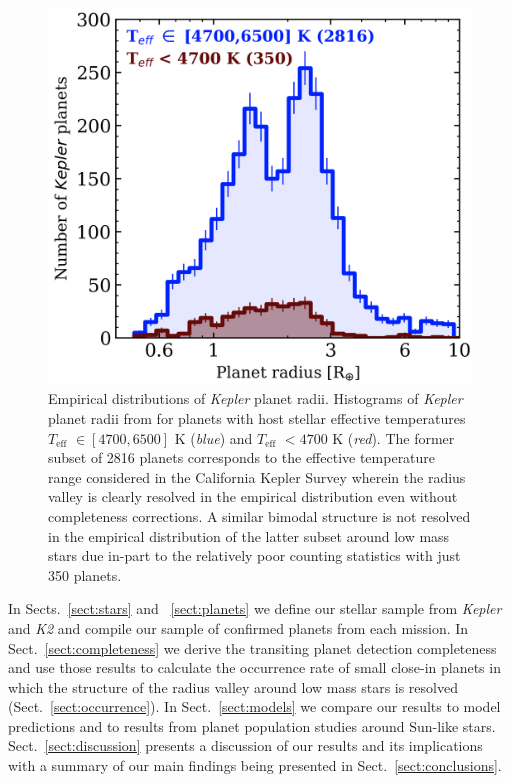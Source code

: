 \documentclass[twocolumn]{emulateapj}
\newcommand{\kepler}[1]{\emph{Kepler}#1}
\newcommand{\ktwo}[1]{\emph{K2}#1}
\newcommand{\teff}[1]{$T_{\text{eff}}$#1}
\begin{document}
\begin{figure}
  \centering
  \includegraphics[width=0.98\hsize]{figures/Bergerplanethist.png}
  \caption{Empirical distributions of \kepler{} planet radii. Histograms of \kepler{} planet radii
    from \cite{berger18} for planets with host stellar effective temperatures \teff{} $\in [4700,6500]$ K
    (\emph{blue}) and \teff{} $<4700$ K (\emph{red}). The former subset of 2816 planets corresponds to the
    effective temperature range considered in the California Kepler Survey \citep[CKS;][]{fulton17}
    wherein the radius valley is clearly
    resolved in the empirical distribution even without completeness corrections. A similar bimodal
    structure is not resolved in the empirical distribution of the latter subset around low mass stars
    due in-part to the relatively poor counting statistics with just 350 planets.}
  \label{fig:berger}
\end{figure}


In Sects.~\ref{sect:stars} and ~\ref{sect:planets} we define our stellar sample from \kepler{} and \ktwo{}
and compile our sample of confirmed planets from each mission.
In Sect.~\ref{sect:completeness} we derive the transiting planet detection completeness and use those results
to calculate the occurrence rate of small close-in planets in which the structure of the radius valley around
low mass stars is resolved (Sect.~\ref{sect:occurrence}). In Sect.~\ref{sect:models} we compare our results to
model predictions and to results from planet population studies around Sun-like stars. 
Sect.~\ref{sect:discussion} presents a discussion of our results
and its implications with a summary of our main findings being presented in Sect.~\ref{sect:conclusions}.
\end{document}
